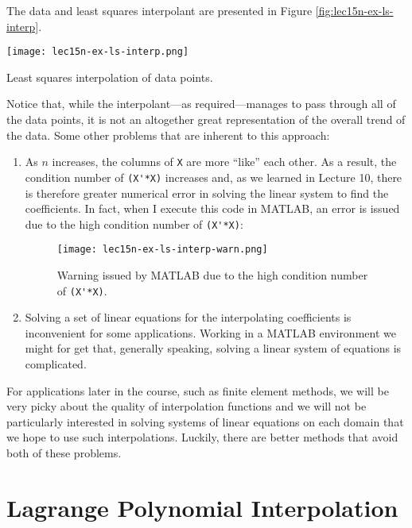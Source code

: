 \noindent The data and least squares interpolant are presented in Figure \ref{fig:lec15n-ex-ls-interp}.  
\begin{marginfigure}
\texttt{[image: lec15n-ex-ls-interp.png]}
\caption{Least squares interpolation of data points.}
\label{fig:lec15n-ex-ls-interp}
\end{marginfigure}
Notice that, while the interpolant---as required---manages to pass through all of the data points, it is not an altogether great representation of the overall trend of the data. Some other problems that are inherent to this approach:
\begin{enumerate}
\item As $n$ increases, the columns of \lstinline[style=myMatlab]{X} are more ``like'' each other.  As a result, the condition number of \lstinline[style=myMatlab]{(X'*X)} increases and, as we learned in Lecture 10, there is therefore greater numerical error in solving the linear system to find the coefficients.  In fact, when I execute this code in MATLAB, an error is issued due to the high condition number of \lstinline[style=myMatlab]{(X'*X)}:

\begin{figure}
\texttt{[image: lec15n-ex-ls-interp-warn.png]}
\caption{Warning issued by MATLAB due to the high condition number of \lstinline[style=myMatlab]{(X'*X)}.}
\label{fig:lec15n-ex-ls-interp-warn}
\end{figure}

\item Solving a set of linear equations for the interpolating coefficients is inconvenient for some applications.  Working in a MATLAB environment we might for get that, generally speaking, solving a linear system of equations is complicated. 
\end{enumerate}

\noindent For applications later in the course, such as finite element methods, we will be very picky about the quality of interpolation functions and we will not be particularly interested in solving systems of linear equations on each domain that we hope to use such interpolations.  Luckily, there are better methods that avoid both of these problems.

\section{Lagrange Polynomial Interpolation}

